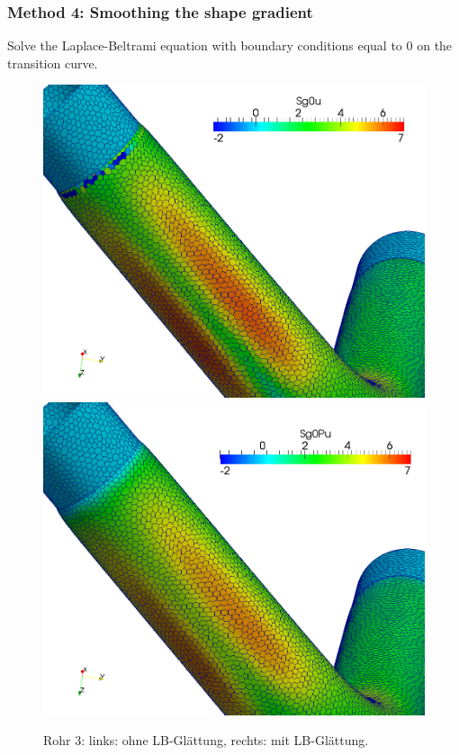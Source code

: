 \documentclass[oneside]{article}
\numberwithin{equation}{section}
\numberwithin{figure}{section}
\numberwithin{figure}{section}
\begin{document}
\subsubsection{Method 4: Smoothing the shape gradient}
Solve the Laplace-Beltrami equation with boundary conditions equal to 0 on the transition curve.
\begin{figure}[htbp]
    \centering
    \includegraphics[scale=0.12]{Rohr3_lb0.png} 
    \includegraphics[scale=0.12]{Rohr3_lb1.png} 
    \caption{Rohr 3: links: ohne LB-Glättung, rechts: mit LB-Glättung.} 
\end{figure}
\end{document}
